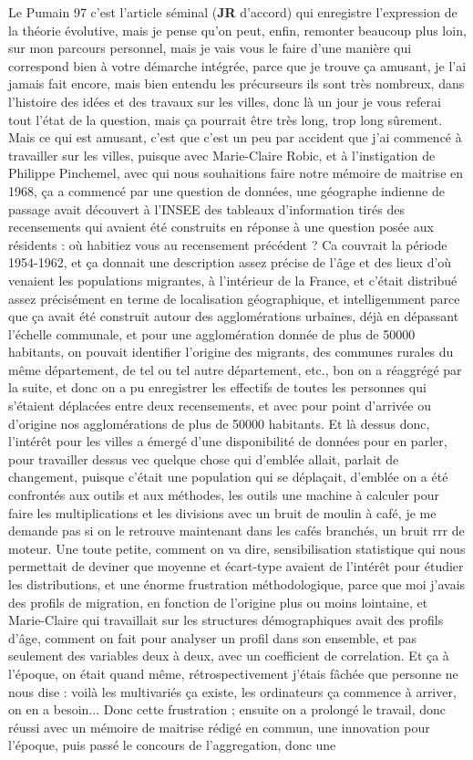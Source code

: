 \documentclass[12pt]{article}
\begin{document}
Le Pumain 97 c'est l'article séminal (\textbf{JR} d'accord) qui enregistre l'expression de la théorie évolutive, mais je pense qu'on peut, enfin, remonter beaucoup plus loin, sur mon parcours personnel, mais je vais vous le faire d'une manière qui correspond bien à votre démarche intégrée, parce que je trouve ça amusant, je l'ai jamais fait encore, mais bien entendu les précurseurs ils sont très nombreux, dans l'histoire des idées et des travaux sur les villes, donc là un jour je vous referai tout l'état de la question, mais ça pourrait être très long, trop long sûrement. Mais ce qui est amusant, c'est que c'est un peu par accident que j'ai commencé à travailler sur les villes, puisque avec Marie-Claire Robic, et à l'instigation de Philippe Pinchemel, avec qui nous souhaitions faire notre mémoire de maitrise en 1968, ça a commencé par une question de données, une géographe indienne de passage avait découvert à l'INSEE des tableaux d'information tirés des recensements qui avaient été construits en réponse à une question posée aux résidents : où habitiez vous au recensement précédent ? Ca couvrait la période 1954-1962, et ça donnait une description assez précise de l'âge et des lieux d'où venaient les populations migrantes, à l'intérieur de la France, et c'était distribué assez précisément en terme de localisation géographique, et intelligemment parce que ça avait été construit autour des agglomérations urbaines, déjà en dépassant l'échelle communale, et pour une agglomération donnée de plus de 50000 habitants, on pouvait identifier l'origine des migrants, des communes rurales du même département, de tel ou tel autre département, etc., bon on a réaggrégé par la suite, et donc on a pu enregistrer les effectifs de toutes les personnes qui s'étaient déplacées entre deux recensements, et avec pour point d'arrivée ou d'origine nos agglomérations de plus de 50000 habitants. Et là dessus donc, l'intérêt pour les villes a émergé d'une disponibilité de données pour en parler, pour travailler dessus vec quelque chose qui d'emblée allait, parlait de changement, puisque c'était une population qui se déplaçait, d'emblée on a été confrontés aux outils et aux méthodes, les outils une machine à calculer pour faire les multiplications et les divisions avec un bruit de moulin à café, je me demande pas si on le retrouve maintenant dans les cafés branchés, un bruit rrr de moteur. Une toute petite, comment on va dire, sensibilisation statistique qui nous permettait de deviner que moyenne et écart-type avaient de l'intérêt pour étudier les distributions, et une énorme frustration méthodologique, parce que moi j'avais des profils de migration, en fonction de l'origine plus ou moins lointaine, et Marie-Claire qui travaillait sur les structures démographiques avait des profils d'âge, comment on fait pour analyser un profil dans son ensemble, et pas seulement des variables deux à deux, avec un coefficient de correlation. Et ça à l'époque, on était quand même, rétrospectivement j'étais fâchée que personne ne nous dise : voilà les multivariés ça existe, les ordinateurs ça commence à arriver, on en a besoin... Donc cette frustration ; ensuite on a prolongé le travail, donc réussi avec un mémoire de maitrise rédigé en commun, une innovation pour l'époque, puis passé le concours de l'aggregation, donc une 
\end{document}
